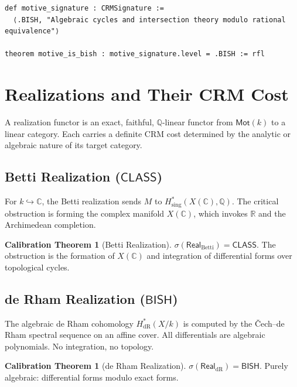 \documentclass[11pt,a4paper]{article}
\theoremstyle{plain}
\theoremstyle{definition}
\newtheorem{calibration}[theorem]{Calibration Theorem}
\newcommand{\BISH}{\textsf{BISH}}
\newcommand{\CLASS}{\textsf{CLASS}}
\newcommand{\Mot}{\mathsf{Mot}}
\newcommand{\Real}{\mathsf{Real}}
\newcommand{\sig}{\sigma}
\newcommand{\Q}{\mathbb{Q}}
\newcommand{\R}{\mathbb{R}}
\newcommand{\C}{\mathbb{C}}
\begin{document}
\begin{tcolorbox}[leanbox={Lean: Motive signature}]
\begin{Verbatim}[fontsize=\small]
def motive_signature : CRMSignature :=
  ⟨.BISH, "Algebraic cycles and intersection theory modulo rational equivalence"⟩

theorem motive_is_bish : motive_signature.level = .BISH := rfl
\end{Verbatim}
\end{tcolorbox}


\section{Realizations and Their CRM Cost}\label{sec:realizations}

A realization functor is an exact, faithful, $\Q$-linear functor from $\Mot(k)$ to a linear category. Each carries a definite CRM cost determined by the analytic or algebraic nature of its target category.

\subsection{Betti Realization ($\CLASS$)}

For $k \hookrightarrow \C$, the Betti realization sends $M$ to $H^*_{\mathrm{sing}}(X(\C), \Q)$. The critical obstruction is forming the complex manifold $X(\C)$, which invokes $\R$ and the Archimedean completion. 

\begin{calibration}[Betti Realization]\label{cal:betti}
$\sig(\Real_{\mathrm{Betti}}) = \CLASS$. The obstruction is the formation of $X(\C)$ and integration of differential forms over topological cycles.
\end{calibration}

\subsection{de Rham Realization ($\BISH$)}

The algebraic de Rham cohomology $H^*_{\mathrm{dR}}(X/k)$ is computed by the \v{C}ech--de Rham spectral sequence on an affine cover. All differentials are algebraic polynomials. No integration, no topology.

\begin{calibration}[de Rham Realization]\label{cal:derham}
$\sig(\Real_{\mathrm{dR}}) = \BISH$. Purely algebraic: differential forms modulo exact forms.
\end{calibration}
\end{document}
